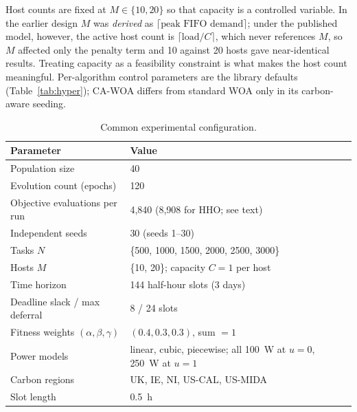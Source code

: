 \documentclass[12pt,a4paper]{article}
\begin{document}
Host counts are fixed at $M\in\{10,20\}$ so that capacity is a controlled variable. In the earlier design $M$
was \emph{derived} as $\lceil\text{peak FIFO demand}\rceil$; under the published model, however, the active
host count is $\lceil\text{load}/C\rceil$, which never references $M$, so $M$ affected only the penalty term
and 10 against 20 hosts gave near-identical results. Treating capacity as a feasibility constraint is what
makes the host count meaningful.
Per-algorithm control parameters are the library defaults (Table~\ref{tab:hyper}); CA-WOA differs from
standard WOA only in its carbon-aware seeding.

\begin{table}[H]\centering \footnotesize
\caption{Common experimental configuration.}\label{tab:config}
\begin{tabular}{@{}ll@{}}
\toprule Parameter & Value \\ \midrule
Population size & 40 \\
Evolution count (epochs) & 120 \\
Objective evaluations per run & 4{,}840 (8{,}908 for HHO; see text) \\
Independent seeds & 30 (seeds 1--30) \\
Tasks $N$ & \{500, 1000, 1500, 2000, 2500, 3000\} \\
Hosts $M$ & \{10, 20\}; capacity $C=1$ per host \\
Time horizon & 144 half-hour slots (3 days) \\
Deadline slack / max deferral & 8 / 24 slots \\
Fitness weights $(\alpha,\beta,\gamma)$ & $(0.4, 0.3, 0.3)$, sum $=1$ \\
Power models & linear, cubic, piecewise; all 100~W at $u{=}0$, 250~W at $u{=}1$ \\
Carbon regions & UK, IE, NI, US-CAL, US-MIDA \\
Slot length & 0.5~h \\
\bottomrule
\end{tabular}
\end{table}
\end{document}
